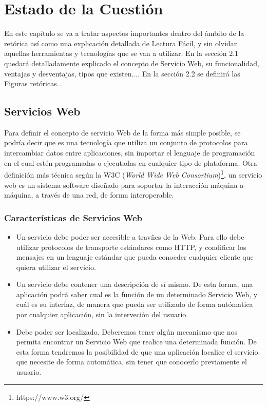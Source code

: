 \chapter{Estado de la Cuestión}
\label{cap:estadoDeLaCuestion}
En este capítulo se va a tratar aspectos importantes dentro del ámbito de la retórica así como una explicación detallada de Lectura Fácil, y sin olvidar aquellas herramientas y tecnologías que se van a utilizar.
En la sección 2.1 quedará detalladamente explicado el concepto de Servicio Web, su funcionalidad, ventajas y desventajas, tipos que existen....
En la sección 2.2 se definirá las Figuras retóricas...



\section{Servicios Web}
\label{cap:sec:servicios_web}

Para definir el concepto de servicio Web de la forma más simple posible, se podría decir que es una tecnología que utiliza un conjunto de protocolos para intercambiar datos entre aplicaciones, sin importar el lenguaje de programación en el cual estén programadas o ejecutadas en cualquier tipo de plataforma. Otra definición más técnica según la W3C (\textit{World Wide Web Consortium})\footnote{https://www.w3.org/},  un servicio web es un sistema software diseñado para soportar la interacción máquina-a-máquina, a través de una red, de forma interoperable. 

\subsection{Características de  Servicios Web}
\label{cap:subsec:serviciosweb}
\begin{itemize}

\item Un servicio debe poder ser accesible a travñes de la Web. Para ello debe utilizar protocolos de transporte estándares como HTTP, y condificar los mensajes en un lenguaje estándar que pueda conocder cualquier cliente que quiera utilizar el servicio. 

\item Un servicio debe contener una descripción de sí mismo. De esta forma, una aplicación podrá saber cual es la función de un determinado Servicio Web, y cuál es su interfaz, de manera que pueda ser utilizado de forma autómatica por cualquier aplicación, sin la interveción del usuario.
\item Debe poder ser localizado. Deberemos tener algún mecanismo que nos permita encontrar un Servicio Web que realice una determinada función. De esta forma tendremos la posibilidad de que una aplicación localice el servicio que necesite de forma automática, sin tener que conocerlo previamente el usuario.
\end{itemize}


